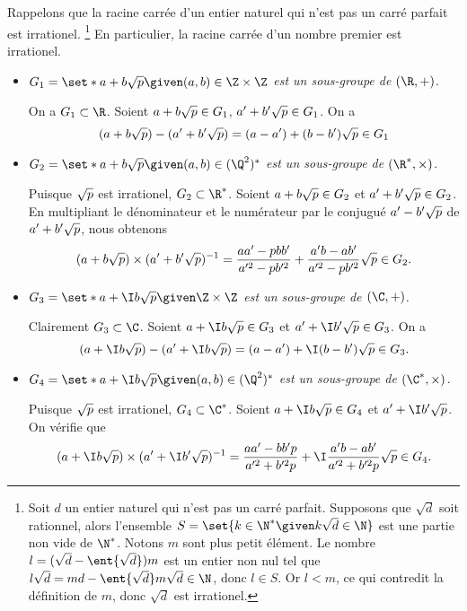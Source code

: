 Rappelons que la racine carrée d'un entier naturel qui n'est pas un carré parfait est
irrationel.
\footnote{
  Soit $d$ un entier naturel qui n'est pas un carré parfait.
  Supposons que $\sqrt{d}$ soit rationnel, alors l'ensemble $S = \set{k\in\N^* \given k\sqrt{d}\in\N}$ est une partie non vide de $\N^*$.
  Notons $m$ sont plus petit élément.
  Le nombre $l = (\sqrt{d} - \ent{\sqrt{d}})m$ est un entier non nul tel que $l\sqrt{d} = md - \ent{\sqrt{d}}m\sqrt{d}\in\N$, donc $l\in S$.
  Or $l < m$, ce qui contredit la définition de $m$, donc $\sqrt{d}$ est irrationel.
}
En particulier, la racine carrée d'un nombre premier est irrationel.

\begin{itemize}
  \item
    \emph{$G_1 = \set*{a + b\sqrt{\smash[b]{p}} \given (a,b)\in\Z\times\Z}$ est un sous-groupe de $(\R,+)$.}

    On a $G_1\subset \R$.
    Soient $a + b\sqrt{\smash[b]{p}}\in G_1$, $a' + b'\sqrt{\smash[b]{p}}\in G_1$. On a
    \[
      (a + b\sqrt{\smash[b]{p}}) - (a' + b'\sqrt{\smash[b]{p}})
        = (a - a') + (b - b')\sqrt{\smash[b]{p}}
        \in G_1
    \]

  \item
    \emph{$G_2 = \set*{a + b\sqrt{\smash[b]{p}} \given (a,b)\in(\Q^2)^*}$ est un sous-groupe de $(\R^*,\times)$.}

    Puisque $\sqrt{\smash[b]{p}}$ est irrationel, $G_2\subset\R^*$.
    Soient $a + b\sqrt{\smash[b]{p}}\in G_2$ et $a' + b'\sqrt{\smash[b]{p}}\in G_2$.
    En multipliant le dénominateur et le numérateur par le conjugué $a' - b'\sqrt{\smash[b]{p}}$ de $a' + b'\sqrt{\smash[b]{p}}$, nous obtenons
    \[
      (a + b\sqrt{\smash[b]{p}})\times (a' + b'\sqrt{\smash[b]{p}})^{-1}
        = \frac{aa' - pbb'}{a'^2 - pb'^2}
          +\frac{a'b - ab'}{a'^2 - pb'^2}\sqrt{\smash[b]{p}}
        \in G_2.
    \]

  \item
    \emph{$G_3 = \set*{a + \I b\sqrt{\smash[b]{p}} \given \Z\times\Z}$ est un sous-groupe de $(\C,+)$.}

    Clairement $G_3\subset \C$.
    Soient $a + \I b\sqrt{\smash[b]{p}}\in G_3$ et $a' + \I b'\sqrt{\smash[b]{p}}\in G_3$. On a
    \[
      (a + \I b\sqrt{\smash[b]{p}}) - (a' + \I b\sqrt{\smash[b]{p}})
        = (a - a') + \I (b - b') \sqrt{\smash[b]{p}}
        \in G_3.
    \]

  \item
    \emph{$G_4 = \set*{a + \I b\sqrt{\smash[b]{p}} \given (a,b)\in(\Q^2)^*}$ est un sous-groupe de $(\C^*,\times)$.}

    Puisque $\sqrt{\smash[b]{p}}$ est irrationel, $G_4\subset\C^*$.
    Soient $a + \I b\sqrt{\smash[b]{p}}\in G_4$ et $a' + \I b'\sqrt{\smash[b]{p}}$.
    On vérifie que
    \[
      (a + \I b\sqrt{\smash[b]{p}})\times (a' + \I b'\sqrt{\smash[b]{p}})^{-1}
        = \frac{aa' - bb'p}{a'^2 + b'^2p}
          + \I \frac{a'b - ab'}{a'^2 + b'^2p} \sqrt{\smash[b]{p}}
        \in G_4.
    \]
\end{itemize}
